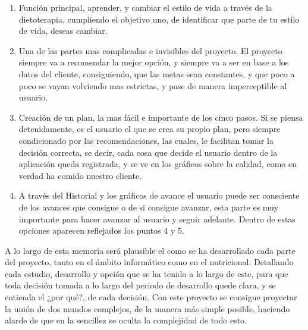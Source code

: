 \begin{enumerate}
\item	Función principal, aprender, y cambiar el estilo de vida a través de la dietoterapia, cumpliendo el objetivo uno, de identificar que parte de tu estilo de vida, deseas cambiar.
\item	Una de las partes mas complicadas e invisibles del proyecto. El proyecto siempre va a recomendar  la mejor opción, y siempre va a ser en base a los datos del cliente, consiguiendo, que las metas sean constantes, y que poco a poco se vayan volviendo mas estrictas, y pase de manera imperceptible al usuario.
\item	Creación de un plan, la mas fácil e importante de los cinco pasos. Si se piensa detenidamente, es el usuario el que se crea su propio plan, pero siempre condicionado por las recomendaciones, las cuales, le facilitan tomar la decisión correcta, se decir, cada cosa que decide el usuario dentro de la aplicación queda registrada, y se ve en los gráficos sobre la calidad, como en verdad ha comido nuestro cliente.
\item A través del Historial y los gráficos de avance el usuario puede ser consciente de los avances que consigue o de si consigue avanzar, esta parte es muy importante para hacer avanzar al usuario y seguir adelante. Dentro de estas opciones aparecen reflejados los puntos 4 y 5.
\end{enumerate}

A lo largo de esta memoria será plausible el como se ha desarrollado cada parte del proyecto, tanto en el ámbito informático como en el nutricional. Detallando cada estudio, desarrollo y opción que se ha tenido a lo largo de este, para que toda decisión tomada a lo largo del periodo de desarrollo quede clara, y se entienda el ¿por qué?, de cada decisión. Con este proyecto se consigue proyectar la unión de dos mundos complejos, de la manera más simple posible, haciendo alarde de que en la sencillez se oculta la complejidad de todo esto.
